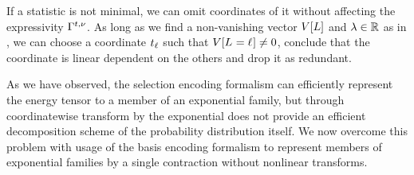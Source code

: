 If a statistic is not minimal, we can omit coordinates of it without affecting the expressivity $\Gamma^{t,\nu}$.
As long as we find a non-vanishing vector $V[L]$ and $\lambda\in\mathbb{R}$ as in , we can choose a coordinate $t_{\ell}$ such that $V[L_{}=\ell_{}]\neq0$, conclude that the coordinate is linear dependent on the others and drop it as redundant.



As we have observed, the selection encoding formalism can efficiently represent the energy tensor to a member of an exponential family, but through coordinatewise transform by the exponential does not provide an efficient decomposition scheme of the probability distribution itself.
We now overcome this problem with usage of the basis encoding formalism to represent members of exponential families by a single contraction without nonlinear transforms.


